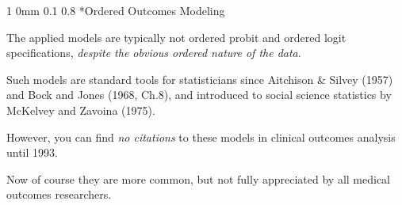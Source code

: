 \documentclass[12pt]{article}
\makeatletter
\newcommand{\9}{\\[9pt]}
\renewcommand{\section}{\@startsection
	    {section}%
	    {1}%
	    {0mm}%
	    {0.1\baselineskip}%
	    {0.8\baselineskip}%
	    {\newpage \color[cmyk]{0.43,0,0.01,0} \center\LARGE}}%
\makeatother
\begin{document}
\begin{landscape}
\begin{Large}
{\section*{Ordered Outcomes Modeling}
\begin{ohlist}
    \item   The applied models are typically not \textcolor{MyEmph}{ordered probit} and \textcolor{MyEmph}{ordered logit}
            specifications, \emph{despite the obvious ordered nature of the data}.
    \item   Such models are standard tools for statisticians since Aitchison \& Silvey (1957) and Bock and Jones (1968, Ch.8), and
            introduced to social science statistics by McKelvey and Zavoina (1975). 
    \item   However, you can find \emph{no citations} to these models in clinical outcomes analysis until 1993.
    \item   Now of course they are more common, but not fully appreciated by all medical outcomes researchers.
\end{ohlist}

}
\end{Large}
\end{landscape}
\end{document}
